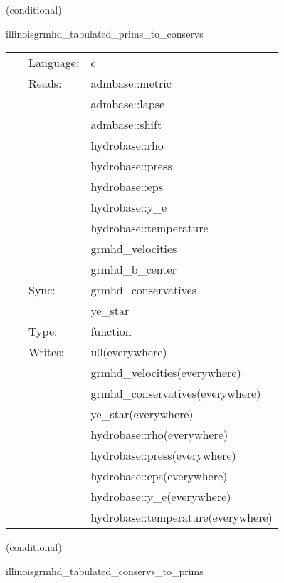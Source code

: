 \vspace{5mm}

   (conditional) 

\hspace{5mm} illinoisgrmhd\_tabulated\_prims\_to\_conservs 

\hspace{5mm}{\it tabulated version of illinoisgrmhd\_prims\_to\_conservs } 


\hspace{5mm}

 \begin{tabular*}{160mm}{cll} 
~ & Language:  & c \\ 
~ & Reads:  & admbase::metric \\ 
~& ~ &admbase::lapse\\ 
~& ~ &admbase::shift\\ 
~& ~ &hydrobase::rho\\ 
~& ~ &hydrobase::press\\ 
~& ~ &hydrobase::eps\\ 
~& ~ &hydrobase::y\_e\\ 
~& ~ &hydrobase::temperature\\ 
~& ~ &grmhd\_velocities\\ 
~& ~ &grmhd\_b\_center\\ 
~ & Sync:  & grmhd\_conservatives \\ 
~& ~ &ye\_star\\ 
~ & Type:  & function \\ 
~ & Writes:  & u0(everywhere) \\ 
~& ~ &grmhd\_velocities(everywhere)\\ 
~& ~ &grmhd\_conservatives(everywhere)\\ 
~& ~ &ye\_star(everywhere)\\ 
~& ~ &hydrobase::rho(everywhere)\\ 
~& ~ &hydrobase::press(everywhere)\\ 
~& ~ &hydrobase::eps(everywhere)\\ 
~& ~ &hydrobase::y\_e(everywhere)\\ 
~& ~ &hydrobase::temperature(everywhere)\\ 
\end{tabular*} 


\vspace{5mm}

   (conditional) 

\hspace{5mm} illinoisgrmhd\_tabulated\_conservs\_to\_prims 


